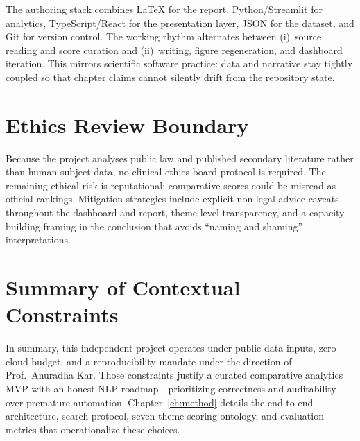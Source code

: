 The authoring stack combines \LaTeX{} for the report, Python/Streamlit for analytics,
TypeScript/React for the presentation layer, JSON for the dataset, and Git for version
control. The working rhythm alternates between (i)~source reading and score curation and
(ii)~writing, figure regeneration, and dashboard iteration. This mirrors scientific
software practice: data and narrative stay tightly coupled so that chapter claims
cannot silently drift from the repository state.

\section{Ethics Review Boundary}
\label{sec:ethicsboundary}

Because the project analyses public law and published secondary literature rather than
human-subject data, no clinical ethics-board protocol is required. The remaining ethical
risk is reputational: comparative scores could be misread as official rankings. Mitigation
strategies include explicit non-legal-advice caveats throughout the dashboard and report,
theme-level transparency, and a capacity-building framing in the conclusion that avoids
``naming and shaming'' interpretations.

\section{Summary of Contextual Constraints}
\label{sec:contextsummary}

In summary, this independent project operates under public-data inputs, zero cloud
budget, and a reproducibility mandate under the direction of Prof.\ Anuradha Kar.
Those constraints justify a curated comparative analytics MVP with an honest NLP
roadmap---prioritizing correctness and auditability over premature automation.
Chapter~\ref{ch:method} details the end-to-end architecture, search protocol,
seven-theme scoring ontology, and evaluation metrics that operationalize these choices.
